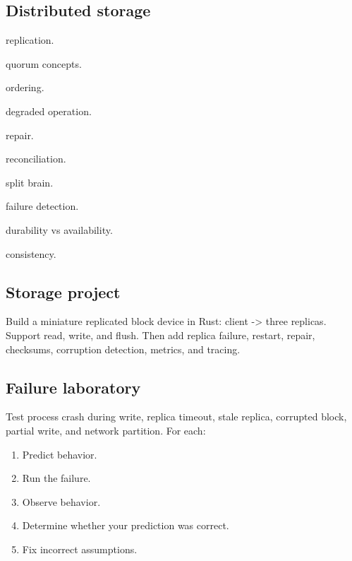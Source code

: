 \documentclass[11pt,letterpaper]{article}
\begin{document}
\subsection*{Distributed storage}

\begin{topics}

\item replication.

\item quorum concepts.

\item ordering.

\item degraded operation.

\item repair.

\item reconciliation.

\item split brain.

\item failure detection.

\item durability vs availability.

\item consistency.

\end{topics}

\subsection*{Storage project}

Build a miniature replicated block device in Rust: client -> three replicas. Support read, write, and flush. Then add replica failure, restart, repair, checksums, corruption detection, metrics, and tracing.

\subsection*{Failure laboratory}

Test process crash during write, replica timeout, stale replica, corrupted block, partial write, and network partition. For each:

\begin{enumerate}

\item Predict behavior.

\item Run the failure.

\item Observe behavior.

\item Determine whether your prediction was correct.

\item Fix incorrect assumptions.

\end{enumerate}
\end{document}
